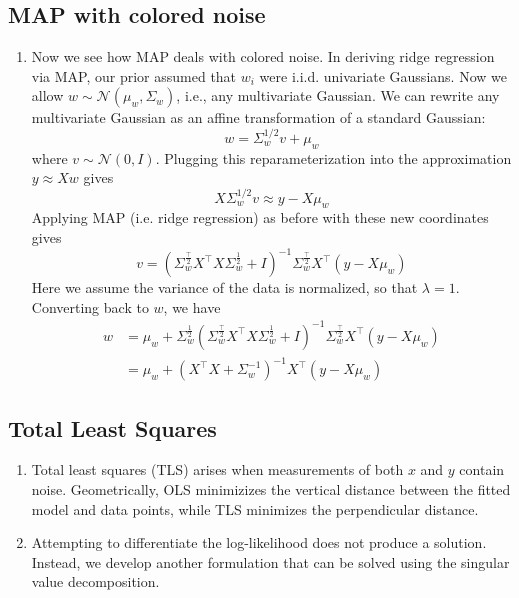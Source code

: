 \documentclass[10pt]{article}
\begin{document}
\begin{multicols}{2}
\begin{addmargin}[0.8em]{0.5em}
    \subsection{MAP with colored noise}
    \begin{enumerate}[label=(\alph*)]
        \item Now we see how MAP deals with colored noise. In deriving ridge regression via MAP, our prior assumed that $w_i$ were i.i.d. univariate Gaussians. Now we allow $w \sim \mathcal{N}(\mu_w, \Sigma_w)$, i.e., any multivariate Gaussian. We can rewrite any multivariate Gaussian as an affine transformation of a standard Gaussian:
        $$
        w = \Sigma_w^{1/2} v + \mu_w
        $$
        where $v \sim \mathcal{N}(0, I)$. Plugging this reparameterization into the approximation $y \approx Xw$ gives
        $$
        X \Sigma_w^{1/2} v \approx y - X \mu_w
        $$
        Applying MAP (i.e. ridge regression) as before with these new coordinates gives
        $$
        v = (\Sigma_w^{\frac{\top}{2}} X^\top X \Sigma_w^{\frac{1}{2}} + I)^{-1} \Sigma_w^{\frac{\top}{2}} X^\top (y - X\mu_w)
        $$
        Here we assume the variance of the data is normalized, so that $\lambda=1$. Converting back to $w$, we have
        \begin{align*}
        w &= \mu_w + \Sigma_w^{\frac{1}{2}} (\Sigma_w^{\frac{\top}{2}} X^\top X \Sigma_w^{\frac{1}{2}} + I)^{-1} \Sigma_w^{\frac{\top}{2}} X^\top (y - X\mu_w) \\
        &= \mu_w + (X^\top X + \Sigma_w^{-1})^{-1} X^\top (y - X\mu_w)
        \end{align*}
    \end{enumerate}    
    \vspace{-0.2cm}
    \subsection{Total Least Squares}
    \vspace{-0.2cm}
    \begin{enumerate}[label=(\alph*)]
        \item Total least squares (TLS) arises when measurements of both $x$ and $y$ contain noise. Geometrically, OLS minimizizes the vertical distance between the fitted model and data points, while TLS minimizes the perpendicular distance.
        \item Attempting to differentiate the log-likelihood does not produce a solution. Instead, we develop another formulation that can be solved using the singular value decomposition.
        

\end{enumerate}
\end{addmargin}
\end{multicols}
\end{document}
